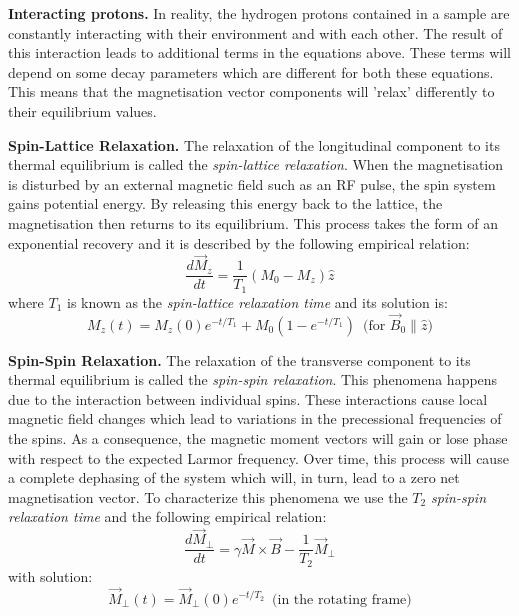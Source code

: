 \hfill

\textbf{Interacting protons.} In reality, the hydrogen protons contained in a sample are constantly interacting with their environment and with each other.
The result of this interaction leads to additional terms in the equations above.
These terms will depend on some decay parameters which are different for both these equations.
This means that the magnetisation vector components will 'relax' differently to their equilibrium values.

\hfill

\textbf{Spin-Lattice Relaxation.} The relaxation of the longitudinal component to its thermal equilibrium is called the \textit{spin-lattice relaxation}. 
When the magnetisation is disturbed by an external magnetic field such as an RF pulse, the spin system gains potential energy.
By releasing this energy back to the lattice, the magnetisation then returns to its equilibrium.
This process takes the form of an exponential recovery and it is described by the following empirical relation:
\begin{equation}\label{eq:411}
    \frac{d \vec{M}_{z}}{dt} = \frac{1}{T_1} (M_0 - M_z) \hat{z}
\end{equation}
where $T_1$ is known as the \textit{spin-lattice relaxation time} and its solution is:
\begin{equation}\label{eq:413}
    M_z(t) = M_z(0) e^{-t/T_1} + M_0(1-e^{-t/T_1}) \, \text{ (for } \vec{B}_0 \parallel \hat{z} \text{)}
\end{equation}

\hfill

\textbf{Spin-Spin Relaxation.} The relaxation of the transverse component to its thermal equilibrium is called the \textit{spin-spin relaxation}. 
This phenomena happens due to the interaction between individual spins.
These interactions cause local magnetic field changes which lead to variations in the precessional frequencies of the spins.
As a consequence, the magnetic moment vectors will gain or lose phase with respect to the expected Larmor frequency.
Over time, this process will cause a complete dephasing of the system which will, in turn, lead to a zero net magnetisation vector.
To characterize this phenomena we use the $T_2$ \textit{spin-spin relaxation time} and the following empirical relation:
\begin{equation}\label{eq:412}
    \frac{d \vec{M}_{\perp}}{dt} = \gamma \vec{M} \times \vec{B} - \frac{1}{T_2} \vec{M}_{\perp}
\end{equation}
with solution:
\begin{equation}\label{eq:414}
    \vec{M}_{\perp}(t) = \vec{M}_{\perp}(0) e^{-t/T_2} \, \text{ (in the rotating frame)}
\end{equation}

